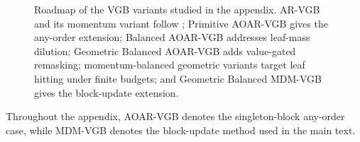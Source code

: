 \documentclass{article}
\numberwithin{theorem}{section}
\numberwithin{proposition}{section}
\numberwithin{corollary}{section}
\numberwithin{lemma}{section}
\numberwithin{conjecture}{section}
\numberwithin{remark}{section}
\numberwithin{definition}{section}
\numberwithin{assumption}{section}
\numberwithin{example}{section}
\begin{document}
\begin{figure}[h!]
{
}
\caption{Roadmap of the VGB variants studied in the appendix. AR-VGB and its momentum variant follow \citet{rohatgi2025taming}; Primitive AOAR-VGB gives the any-order extension; Balanced AOAR-VGB addresses leaf-mass dilution; Geometric Balanced AOAR-VGB adds value-gated remasking; momentum-balanced geometric variants target leaf hitting under finite budgets; and Geometric Balanced MDM-VGB gives the block-update extension.}
\label{fig:appendix_vgb_roadmap}
\end{figure}
Throughout the appendix, AOAR-VGB denotes the singleton-block any-order case, while MDM-VGB denotes the block-update method used in the main text.
\end{document}
